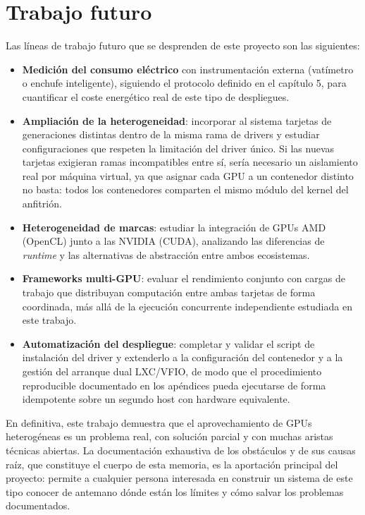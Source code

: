 \section*{Trabajo futuro}

Las líneas de trabajo futuro que se desprenden de este proyecto son las siguientes:

\begin{itemize}
    \item \textbf{Medición del consumo eléctrico} con instrumentación externa (vatímetro o enchufe inteligente), siguiendo el protocolo definido en el capítulo 5, para cuantificar el coste energético real de este tipo de despliegues.

    \item \textbf{Ampliación de la heterogeneidad}: incorporar al sistema tarjetas de generaciones distintas dentro de la misma rama de drivers y estudiar configuraciones que respeten la limitación del driver único. Si las nuevas tarjetas exigieran ramas incompatibles entre sí, sería necesario un aislamiento real por máquina virtual, ya que asignar cada GPU a un contenedor distinto no basta: todos los contenedores comparten el mismo módulo del kernel del anfitrión.

    \item \textbf{Heterogeneidad de marcas}: estudiar la integración de GPUs AMD (OpenCL) junto a las NVIDIA (CUDA), analizando las diferencias de \textit{runtime} y las alternativas de abstracción entre ambos ecosistemas.

    \item \textbf{Frameworks multi-GPU}: evaluar el rendimiento conjunto con cargas de trabajo que distribuyan computación entre ambas tarjetas de forma coordinada, más allá de la ejecución concurrente independiente estudiada en este trabajo.

    \item \textbf{Automatización del despliegue}: completar y validar el script de instalación del driver y extenderlo a la configuración del contenedor y a la gestión del arranque dual LXC/VFIO, de modo que el procedimiento reproducible documentado en los apéndices pueda ejecutarse de forma idempotente sobre un segundo host con hardware equivalente.
\end{itemize}

En definitiva, este trabajo demuestra que el aprovechamiento de GPUs heterogéneas es un problema real, con solución parcial y con muchas aristas técnicas abiertas. La documentación exhaustiva de los obstáculos y de sus causas raíz, que constituye el cuerpo de esta memoria, es la aportación principal del proyecto: permite a cualquier persona interesada en construir un sistema de este tipo conocer de antemano dónde están los límites y cómo salvar los problemas documentados.

